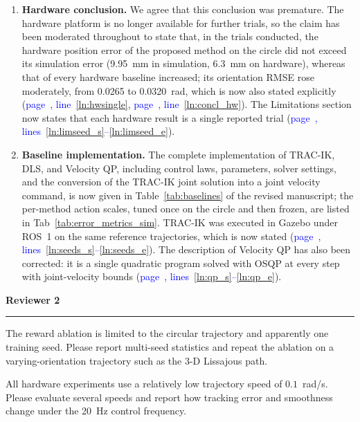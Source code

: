\documentclass[11pt]{elsarticle}
\newcommand{\reviewerheading}[1]{%
  \par\vspace{0.6em}%
  \phantomsection\pdfbookmark[2]{#1}{#1}%
  {\large\bfseries\color{commentframe}#1}\\[-0.6em]
  {\color{commentframe!40}\rule{\linewidth}{0.6pt}}\par}
\newcommand{\mline}[1]{\textcolor{blue}{page~\pageref{#1}, line~\ref{#1}}}
\newcommand{\mlines}[2]{\textcolor{blue}{page~\pageref{#1}, lines~\ref{#1}--\ref{#2}}}
\begin{document}
\begin{responsebox}
\begin{enumerate}
  \item \textbf{Hardware conclusion.} We agree that this conclusion was premature. The hardware platform is no longer available for further trials, so the claim has been moderated throughout to state that, in the trials conducted, the hardware position error of the proposed method on the circle did not exceed its simulation error (9.95~mm in simulation, 6.3~mm on hardware), whereas that of every hardware baseline increased; its orientation RMSE rose moderately, from 0.0265 to 0.0320~rad, which is now also stated explicitly (\mline{ln:hwsingle}, \mline{ln:concl_hw}). The Limitations section now states that each hardware result is a single reported trial (\mlines{ln:limseed_s}{ln:limseed_e}).

  \item \textbf{Baseline implementation.} The complete implementation of TRAC-IK, DLS, and Velocity QP, including control laws, parameters, solver settings, and the conversion of the TRAC-IK joint solution into a joint velocity command, is now given in Table~\ref{tab:baselines} of the revised manuscript; the per-method action scales, tuned once on the circle and then frozen, are listed in Tab~\ref{tab:error_metrics_sim}. TRAC-IK was executed in Gazebo under ROS~1 on the same reference trajectories, which is now stated (\mlines{ln:seeds_s}{ln:seeds_e}). The description of Velocity QP has also been corrected: it is a single quadratic program solved with OSQP at every step with joint-velocity bounds (\mlines{ln:qp_s}{ln:qp_e}).
\end{enumerate}
\end{responsebox}

\reviewerheading{Reviewer 2}

\begin{reviewerbox}
The reward ablation is limited to the circular trajectory and apparently one training seed. Please report multi-seed statistics and repeat the ablation on a varying-orientation trajectory such as the 3-D Lissajous path.

All hardware experiments use a relatively low trajectory speed of \(0.1\)~rad/s. Please evaluate several speeds and report how tracking error and smoothness change under the 20~Hz control frequency.
\end{reviewerbox}
\end{document}
